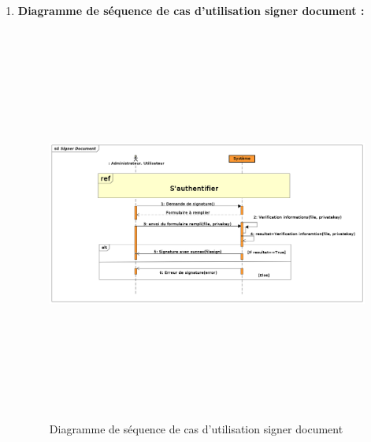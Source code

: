 \begin{enumerate}
		 	\item \textbf{Diagramme de séquence de cas d'utilisation signer document : }
		 	\begin{figure}[H]
		 		\centering
		 		\includegraphics[width=18cm, height=13cm]{../Diagrammes/DiagrammeSequences/signerdocument.png}
		 		\caption{Diagramme de séquence de cas d'utilisation signer document}
		 		\label{diaseq4}
		 	\end{figure}
		 		

\end{enumerate}
